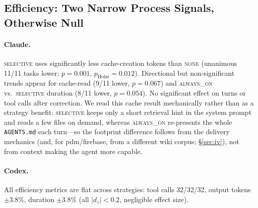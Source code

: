 \documentclass[11pt]{article}
\newcommand{\agentsmd}{\texttt{AGENTS.md}}
\newcommand{\none}{\textsc{none}}
\newcommand{\alwayson}{\textsc{always\_on}}
\newcommand{\selective}{\textsc{selective}}
\begin{document}
\subsection{Efficiency: Two Narrow Process Signals, Otherwise Null}

\paragraph{Claude.}
\selective{} uses significantly less cache-creation tokens than \none{} (unanimous 11/11 tasks lower; $p{=}0.001$, $p_{\text{Holm}}{=}0.012$).
Directional but non-significant trends appear for cache-read (9/11 lower, $p{=}0.067$) and \alwayson{} vs.\ \selective{} duration (8/11 lower, $p{=}0.054$).
No significant effect on turns or tool calls after correction.
We read this cache result mechanically rather than as a strategy benefit: \selective{} keeps only a short retrieval hint in the system prompt and reads a few files on demand, whereas \alwayson{} re-presents the whole \agentsmd{} each turn---so the footprint difference follows from the delivery mechanics (and, for pdm/firebase, from a different wiki corpus; \S\ref{sec:iv}), not from context making the agent more capable.

\paragraph{Codex.}
All efficiency metrics are flat across strategies: tool calls 32/32/32, output tokens $\pm$3.8\%, duration $\pm$3.8\% (all $|d_z|{<}0.2$, negligible effect size).
\end{document}
